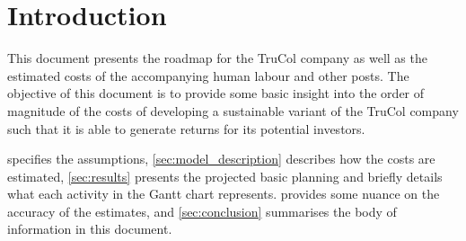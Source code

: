 \section{Introduction}\label{sec:intro}
This document presents the roadmap for the TruCol company as well as the estimated costs of the accompanying human labour and other posts. The objective of this document is to provide some basic insight into the order of magnitude of the costs of developing a sustainable variant of the TruCol company such that it is able to generate returns for its potential investors.

 specifies the assumptions, \cref{sec:model_description} describes how the costs are estimated, \cref{sec:results} presents the projected basic planning and briefly details what each activity in the Gantt chart represents.  provides some nuance on the accuracy of the estimates, and \cref{sec:conclusion} summarises the body of information in this document.